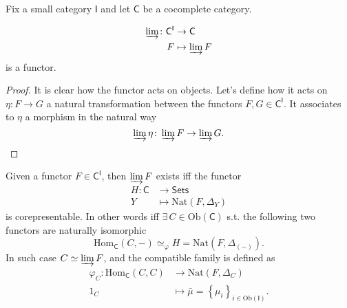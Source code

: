 Fix a small category $\mathsf{I}$ and let $\mathsf{C}$ be a cocomplete category.
\begin{prop}
	\begin{align}
		\varinjlim\colon \mathsf{C}^{\mathsf{I}} &\to \mathsf{C} \\
		F &\mapsto \varinjlim F
	\end{align} 
	is a functor.
\end{prop} 
\begin{proof}
	It is clear how the functor acts on objects.
	Let's define how it acts on $\eta\colon F \to G$ a natural transformation between the functors $F, G \in \mathsf{C}^{\mathsf{I}}$.
	It associates to $\eta$ a morphism in the natural way
	\begin{equation*}
	\varinjlim \eta\colon \varinjlim F \to \varinjlim G.\qedhere
	\end{equation*} 
\end{proof}

\begin{prop}
	Given a functor $F \in \mathsf{C}^{\mathsf{I}}$, then $\varinjlim F$ exists iff the functor
	\begin{align}
		H\colon \mathsf{C} &\to \mathsf{Sets} \\
		Y &\mapsto \mathrm{Nat} \left( F, \Delta_Y \right)
	\end{align} 
	is corepresentable.
	In other words iff $\exists\, C \in \mathrm{Ob} \left(\mathsf{C}\right)$ s.t.
	the following two functors are naturally isomorphic
	\begin{equation}
		\mathrm{Hom}_{\mathsf{C}} \left( C, - \right) \simeq_{\varphi} H = \mathrm{Nat} \left( F, \Delta_{(-)} \right)
	.\end{equation} 
	In such case $C \simeq \varinjlim F$, and the compatible family is defined as
	\begin{align}
		\varphi_C\colon \mathrm{Hom}_{\mathsf{C}} \left( C, C \right) &\to \mathrm{Nat} \left( F, \Delta_C \right) \\
		1_C &\mapsto \bar{\mu} = \left\{ \mu_i \right\}_{i \in \mathrm{Ob} \left(\mathsf{I}\right)} 
	.\end{align} 
\end{prop} 

